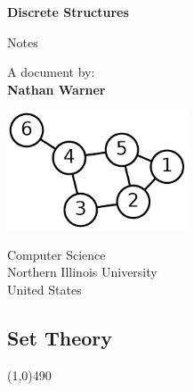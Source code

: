 \documentclass{report}
\title{\Huge{}}
\author{\huge{Nathan Warner}}
\date{\huge{}}
\begin{document}
        \begin{titlepage}
       \begin{center}
           \vspace*{1cm}
    
           \textbf{Discrete Structures}
    
           \vspace{0.5cm}
           Notes
            
                
           \vspace{1.5cm}
            A document by: \\ 
           \textbf{Nathan Warner}
    
           \vfill
                
                
           \vspace{0.8cm}
         
           \includegraphics[width=0.4\textwidth]{./figures/1.png}
                
           Computer Science \\
           Northern Illinois University\\
           United States\\
           
                
       \end{center}
    \end{titlepage}
    \tableofcontents
    \pagebreak 
    \begin{center}
        \section{Set Theory}
    \end{center}
    \line(1,0){490}
    \bigbreak \noindent 
\end{document}
